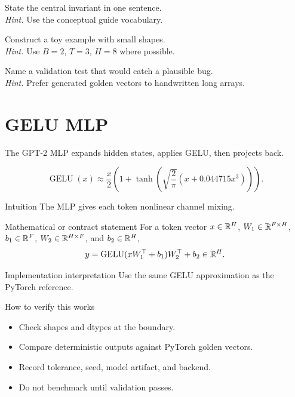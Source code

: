 \begin{chapterexercises}
\item State the central invariant in one sentence.\\
\textit{Hint.} Use the conceptual guide vocabulary.
\item Construct a toy example with small shapes.\\
\textit{Hint.} Use $B=2$, $T=3$, $H=8$ where possible.
\item Name a validation test that would catch a plausible bug.\\
\textit{Hint.} Prefer generated golden vectors to handwritten long arrays.
\end{chapterexercises}

\chapter{GELU MLP}
\label{ch:gelu-mlp}
The GPT-2 MLP expands hidden states, applies GELU, then projects back.

\[
\operatorname{GELU}(x)\approx
\frac{x}{2}\left(1+\tanh\left(\sqrt{\frac{2}{\pi}}\left(x+0.044715x^3\right)\right)\right).
\]

\begin{intuitionbox}{Intuition}
The MLP gives each token nonlinear channel mixing.
\end{intuitionbox}

\begin{definitionbox}{Mathematical or contract statement}
For a token vector \(x\in\mathbb{R}^H\), \(W_1\in\mathbb{R}^{F\times H}\), \(b_1\in\mathbb{R}^F\), \(W_2\in\mathbb{R}^{H\times F}\), and \(b_2\in\mathbb{R}^H\),
\[
y=\operatorname{GELU}(xW_1^\top+b_1)W_2^\top+b_2\in\mathbb{R}^H.
\]
\end{definitionbox}

\begin{implementationbox}{Implementation interpretation}
Use the same GELU approximation as the PyTorch reference.
\end{implementationbox}

\begin{verificationbox}{How to verify this works}
\begin{itemize}
\item Check shapes and dtypes at the boundary.
\item Compare deterministic outputs against PyTorch golden vectors.
\item Record tolerance, seed, model artifact, and backend.
\item Do not benchmark until validation passes.
\end{itemize}
\end{verificationbox}

